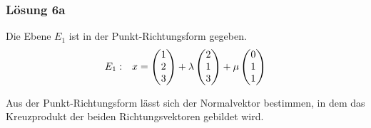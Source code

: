 \subsubsection{Lösung 6a}

Die Ebene $\displaystyle E_{1}$ ist in der Punkt-Richtungsform gegeben. 
\begin{equation*}
	\begin{array}{ r l }
		E_{1} : & x=\begin{pmatrix}
			1\\
			2\\
			3
		\end{pmatrix} +\lambda \begin{pmatrix}
			2\\
			1\\
			3
		\end{pmatrix} +\mu \begin{pmatrix}
			0\\
			1\\
			1
		\end{pmatrix}
	\end{array}
\end{equation*}

Aus der Punkt-Richtungsform lässt sich der Normalvektor bestimmen, in dem das Kreuzprodukt der beiden Richtungsvektoren gebildet wird.

